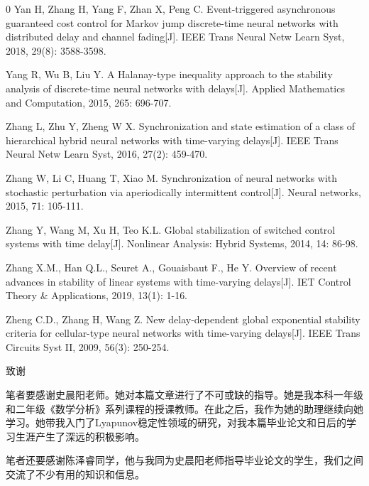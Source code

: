 \documentclass[a4paper, 12pt, oneside]{article}
\theoremstyle{cn_theorem}
\begin{document}
{\begin{thebibliography}{0}
 Yan H, Zhang H, Yang F, Zhan X, Peng C. Event-triggered asynchronous guaranteed cost control for Markov jump discrete-time neural networks with distributed delay and channel fading[J]. IEEE Trans Neural Netw Learn Syst, 2018, 29(8): 3588-3598.

 Yang R, Wu B, Liu Y. A Halanay-type inequality approach to the stability analysis of discrete-time neural networks with delays[J]. Applied Mathematics and Computation, 2015, 265: 696-707.

 Zhang L, Zhu Y, Zheng W X. Synchronization and state estimation of a class of hierarchical hybrid neural networks with time-varying delays[J]. IEEE Trans Neural Netw Learn Syst, 2016, 27(2): 459-470.

 Zhang W, Li C, Huang T, Xiao M. Synchronization of neural networks with stochastic perturbation via aperiodically intermittent control[J]. Neural networks, 2015, 71: 105-111.

 Zhang Y, Wang M, Xu H, Teo K.L. Global stabilization of switched control systems with time delay[J]. Nonlinear Analysis: Hybrid Systems, 2014, 14: 86-98.

 Zhang X.M., Han Q.L., Seuret A., Gouaisbaut F., He Y. Overview of recent advances in stability of linear systems with time-varying delays[J]. IET Control Theory \& Applications, 2019, 13(1): 1-16.

 Zheng C.D., Zhang H, Wang Z. New delay-dependent global exponential stability criteria for cellular-type neural networks with time-varying delays[J]. IEEE Trans Circuits Syst II, 2009, 56(3): 250-254.

\end{thebibliography}
}

\clearpage
{}
{}
\centerline{\heiti 致\hspace{4em}谢}
\vspace{1em}
{\songti
笔者要感谢史晨阳老师。她对本篇文章进行了不可或缺的指导。她是我本科一年级和二年级《数学分析》系列课程的授课教师。在此之后，我作为她的助理继续向她学习。她带我入门了Lyapunov稳定性领域的研究，对我本篇毕业论文和日后的学习生涯产生了深远的积极影响。

笔者还要感谢陈泽睿同学，他与我同为史晨阳老师指导毕业论文的学生，我们之间交流了不少有用的知识和信息。
}

\clearpage
\thispagestyle{empty}
\vspace{1em}
\end{document}
